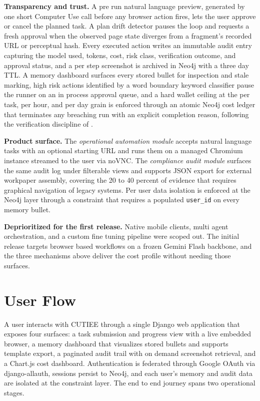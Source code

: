 \documentclass{article}
\theoremstyle{plain}
\theoremstyle{definition}
\theoremstyle{remark}
\begin{document}
\textbf{Transparency and trust.} A pre run natural language preview, generated by one short Computer Use call before any browser action fires, lets the user approve or cancel the planned task. A plan drift detector pauses the loop and requests a fresh approval when the observed page state diverges from a fragment's recorded URL or perceptual hash. Every executed action writes an immutable audit entry capturing the model used, tokens, cost, risk class, verification outcome, and approval status, and a per step screenshot is archived in Neo4j with a three day TTL. A memory dashboard surfaces every stored bullet for inspection and stale marking, high risk actions identified by a word boundary keyword classifier pause the runner on an in process approval queue, and a hard wallet ceiling at the per task, per hour, and per day grain is enforced through an atomic Neo4j cost ledger that terminates any breaching run with an explicit completion reason, following the verification discipline of \citet{nguyen2025verificagent}.

\textbf{Product surface.} The \emph{operational automation module} accepts natural language tasks with an optional starting URL and runs them on a managed Chromium instance streamed to the user via noVNC. The \emph{compliance audit module} surfaces the same audit log under filterable views and supports JSON export for external workpaper assembly, covering the 20 to 40 percent of evidence that requires graphical navigation of legacy systems. Per user data isolation is enforced at the Neo4j layer through a constraint that requires a populated \texttt{user\_id} on every memory bullet.

\textbf{Deprioritized for the first release.} Native mobile clients, multi agent orchestration, and a custom fine tuning pipeline were scoped out. The initial release targets browser based workflows on a frozen Gemini Flash backbone, and the three mechanisms above deliver the cost profile without needing those surfaces.

\section{User Flow}
\label{sec:functionality}

A user interacts with CUTIEE through a single Django web application that exposes four surfaces: a task submission and progress view with a live embedded browser, a memory dashboard that visualizes stored bullets and supports template export, a paginated audit trail with on demand screenshot retrieval, and a Chart.js cost dashboard. Authentication is federated through Google OAuth via django-allauth, sessions persist to Neo4j, and each user's memory and audit data are isolated at the constraint layer. The end to end journey spans two operational stages.
\end{document}
